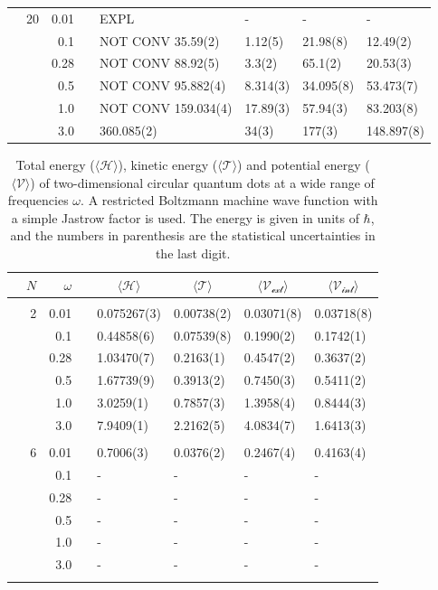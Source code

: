 \begin{table}
\begin{tabularx}{\textwidth}{R{1.5cm}rrcR{2.3cm}R{2.3cm}R{2.3cm}R{2.3cm}}
		&20 & 0.01 && EXPL & - & - & - \\
		&& 0.1 && NOT CONV 35.59(2) & 1.12(5) & 21.98(8) & 12.49(2) \\
		&& 0.28 && NOT CONV 88.92(5) & 3.3(2) & 65.1(2) & 20.53(3) \\
		&& 0.5 && NOT CONV 95.882(4) & 8.314(3) & 34.095(8) & 53.473(7) \\
		&& 1.0 && NOT CONV 159.034(4) & 17.89(3) & 57.94(3) & 83.203(8) \\
		&& 3.0 && 360.085(2) & 34(3) & 177(3) & 148.897(8) \\ \hline \hline
	\end{tabularx}
\end{table} 

\begin{table}
	\caption{Total energy ($\langle\mathcal{H}\rangle$), kinetic energy ($\langle\mathcal{T}\rangle$) and potential energy ($\langle\mathcal{V}\rangle$) of two-dimensional circular quantum dots at a wide range of frequencies $\omega$. A restricted Boltzmann machine wave function with a simple Jastrow factor is used. The energy is given in units of $\hbar$, and the numbers in parenthesis are the statistical uncertainties in the last digit.}
	\label{tab:splitfrequencyQDRBMSJ}
	\begin{tabularx}{\textwidth}{R{1.5cm}rrcR{2.3cm}R{2.3cm}R{2.3cm}R{2.3cm}} \hline\hline
		& & $\omega$ &&  &  &  &  \\ \hline \\
		&2 & 0.01 && 0.075267(3) & 0.00738(2) & 0.03071(8) & 0.03718(8) \\
		&& 0.1 && 0.44858(6) & 0.07539(8) & 0.1990(2) & 0.1742(1) \\
		&& 0.28 && 1.03470(7) & 0.2163(1) & 0.4547(2) & 0.3637(2) \\
		&& 0.5 && 1.67739(9) & 0.3913(2) & 0.7450(3) & 0.5411(2)\\
		&& 1.0 && 3.0259(1) & 0.7857(3) & 1.3958(4) & 0.8444(3)\\
		&& 3.0 && 7.9409(1) & 2.2162(5) & 4.0834(7) & 1.6413(3) \\ \hdashline \\
		
		&6 & 0.01 && 0.7006(3) & 0.0376(2) & 0.2467(4) & 0.4163(4) \\
		&& 0.1 && - & - & - & - \\
		&& 0.28 && - & - & - & - \\
		&& 0.5 && - & - & - & - \\
		&& 1.0 && - & - & - & - \\
		&& 3.0 && - & - & - & - \\ \hdashline \\
		

\end{tabularx}
\end{table}
